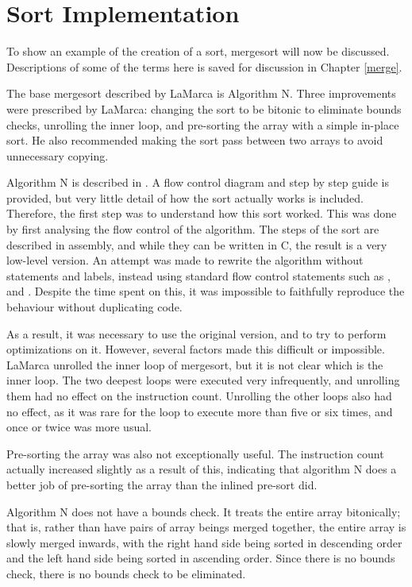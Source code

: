 
\section{Sort Implementation}

To show an example of the creation of a sort, mergesort will now be discussed.
Descriptions of some of the terms here is saved for discussion in Chapter
\ref{merge}.

The base mergesort described by LaMarca is Algorithm N. Three improvements
were prescribed by LaMarca: changing the sort to be bitonic to eliminate bounds
checks, unrolling the inner loop, and pre-sorting the array with a simple in-place
sort. He also recommended making the sort pass between two arrays to avoid
unnecessary copying.

Algorithm N is described in \cite{Knuth98}. A flow control diagram and step by
step guide is provided, but very little detail of how the sort actually works is
included. Therefore, the first step was to understand how this sort worked. This
was done by first analysing the flow control of the algorithm. The steps of the
sort are described in assembly, and while they can be written in C, the result
is a very low-level version. An attempt was made to rewrite the algorithm
without  statements and labels, instead using standard flow control
statements such as ,  and . Despite the time spent
on this, it was impossible to faithfully reproduce the behaviour without
duplicating code.

As a result, it was necessary to use the original version, and to try to perform
optimizations on it. However, several factors made this difficult or impossible.
LaMarca unrolled the inner loop of mergesort, but it is not clear which is the
inner loop. The two deepest loops were executed very infrequently, and
unrolling them had no effect on the instruction count. Unrolling the other loops
also had no effect, as it was rare for the loop to execute more than five or six
times, and once or twice was more usual.

Pre-sorting the array was also not exceptionally useful. The instruction count
actually increased slightly as a result of this, indicating that algorithm N
does a better job of pre-sorting the array than the inlined pre-sort did.

Algorithm N does not have a bounds check. It treats the entire array
bitonically; that is, rather than have pairs of array beings merged together,
the entire array is slowly merged inwards, with the right hand side being sorted
in descending order and the left hand side being sorted in ascending order.
Since there is no bounds check, there is no bounds check to be eliminated.


